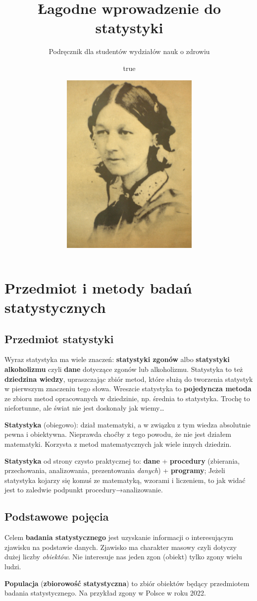 \documentclass[
  openany]{book}
\title{Łagodne wprowadzenie do statystyki}
\subtitle{Podręcznik dla studentów wydziałów nauk o zdrowiu}
\author{true}
\date{\includegraphics[width=0.5\textwidth,height=\textheight]{./FN.jpg}}
\begin{document}
\maketitle

{
\setcounter{tocdepth}{1}
\tableofcontents
}
\hypertarget{przedmiotbadan}{%
\chapter{Przedmiot i metody badań statystycznych}\label{przedmiotbadan}}

\hypertarget{przedmiot-statystyki}{%
\section{Przedmiot statystyki}\label{przedmiot-statystyki}}

Wyraz statystyka ma wiele znaczeń: \textbf{statystyki zgonów} albo \textbf{statystyki
alkoholizmu} czyli \textbf{dane} dotyczące zgonów lub alkoholizmu.
Statystyka to też \textbf{dziedzina wiedzy}, upraszczając zbiór metod, które służą
do tworzenia statystyk w pierwszym znaczeniu tego słowa.
Wreszcie statystyka to \textbf{pojedyncza metoda} ze zbioru metod opracowanych
w dziedzinie, np. średnia to statystyka. Trochę to niefortunne, ale
świat nie jest doskonały jak wiemy\ldots{}

\textbf{Statystyka} (obiegowo): dział matematyki, a w związku z tym
wiedza absolutnie
pewna i obiektywna. Nieprawda choćby z tego powodu,
że nie jest działem matematyki.
Korzysta z metod matematycznych jak wiele innych dziedzin.

\textbf{Statystyka} od strony czysto praktycznej to: \textbf{dane} + \textbf{procedury}
(zbierania, przechowania, analizowania, prezentowania \emph{danych})
+ \textbf{programy}; Jeżeli statystyka kojarzy się komuś ze matematyką,
wzorami i liczeniem, to jak widać jest to zaledwie podpunkt
procedury→analizowanie.

\hypertarget{podstawowe-pojux119cia}{%
\section{Podstawowe pojęcia}\label{podstawowe-pojux119cia}}

Celem \textbf{badania statystycznego} jest uzyskanie informacji
o interesującym zjawisku na podstawie danych.
Zjawisko ma charakter masowy czyli dotyczy dużej liczby \emph{obiektów}.
Nie interesuje nas jeden zgon (obiekt) tylko zgony wielu ludzi.

\textbf{Populacja} (\textbf{zbiorowość statystyczna}) to zbiór obiektów będący
przedmiotem badania statystycznego. Na przykład zgony w Polsce w roku 2022.
\end{document}
